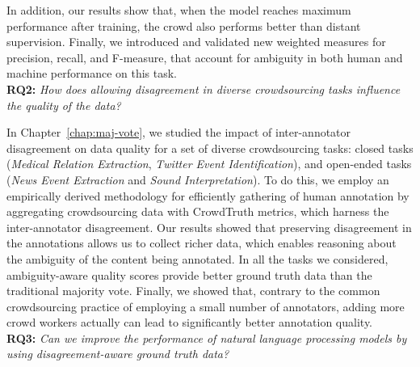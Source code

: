 In addition, our results show that, when the model reaches maximum performance after training, the crowd also performs better than distant supervision. Finally, we introduced and validated new weighted measures for precision, recall, and F-measure, that account for ambiguity in both human and machine performance on this task. \\


\textbf{RQ2:} \textit{How does allowing disagreement in diverse crowdsourcing tasks influence the quality of the data?}

In Chapter~\ref{chap:maj-vote}, we studied the impact of inter-annotator disagreement on data quality for a set of diverse crowdsourcing tasks: closed tasks (\textit{Medical Relation Extraction}, \textit{Twitter Event Identification}), and open-ended tasks (\textit{News Event Extraction} and \textit{Sound Interpretation}). To do this, we employ an empirically derived methodology for efficiently gathering of human annotation by aggregating crowdsourcing data with CrowdTruth metrics, which harness the inter-annotator disagreement. Our results showed that preserving disagreement in the annotations allows us to collect richer data, which enables reasoning about the ambiguity of the content being annotated. In all the tasks we considered, ambiguity-aware quality scores provide better ground truth data than the traditional majority vote. Finally, we showed that, contrary to the common crowdsourcing practice of employing a small number of annotators, adding more crowd workers actually can lead to significantly better annotation quality. \\


\textbf{RQ3:} \textit{Can we improve the performance of natural language processing models by using disagreement-aware ground truth data?}

